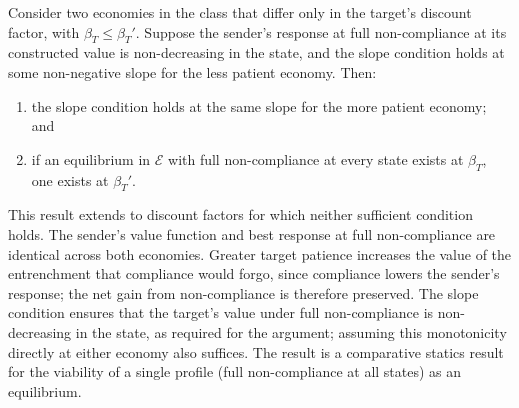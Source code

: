\begin{proposition}
\label{prop:patience-existence}
Consider two economies in the class that differ only in the target's discount factor,
with $\beta_T\le\beta_T'$. Suppose the sender's response at full non-compliance at its
constructed value is non-decreasing in the state, and the slope condition holds at
some non-negative slope for the less patient economy. Then:
\begin{enumerate}[label=(\roman*)]
\item the slope condition holds at the same slope for the more patient economy; and
\item if an equilibrium in $\mathcal E$ with full non-compliance at every state exists
at $\beta_T$, one exists at $\beta_T'$.
\end{enumerate}
\end{proposition}

This result extends to discount factors for which neither sufficient condition holds.
The sender's value function and best response at full non-compliance are identical
across both economies. Greater target patience increases the value of the entrenchment
that compliance would forgo, since compliance lowers the sender's response; the net gain
from non-compliance is therefore preserved. The slope condition ensures that the
target's value under full non-compliance is non-decreasing in the state, as required for
the argument; assuming this monotonicity directly at either economy also suffices. The
result is a comparative statics result for the viability of a single profile (full
non-compliance at all states) as an equilibrium.

